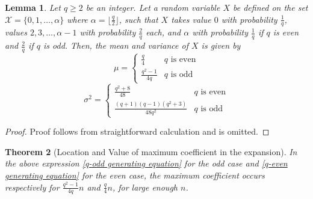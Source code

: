 \documentclass[a4paper,12pt]{article}
\newtheorem{theorem}{Theorem}
\newtheorem{lemma}[theorem]{Lemma}
\begin{document}
\begin{lemma}\label{mean and variance lemma}
    Let $q \geq 2$ be an integer. Let a random variable $X$ be defined on the set $\mathcal{X} = \{0, 1, \ldots, \alpha\}$ where $\alpha = \lfloor \frac{q}{2} \rfloor$, such that $X$ takes value $0$ with probability $\frac{1}{q}$, values $2,3, \ldots, \alpha-1$  with probability $\frac{2}{q}$ each, and $\alpha$ with probability $\frac{1}{q}$ if $q$ is even and $\frac{2}{q}$ if $q$ is odd. Then, the mean and variance of $X$ is given by
    \begin{equation}
        \mu = \begin{cases}
            \frac{q}{4} & \text{$q$ is even}\\
            \frac{q^2 -1}{4q} & \text{$q$ is odd}
        \end{cases}
    \end{equation}
    \begin{equation}
        \sigma^2 = \begin{cases}
            \frac{q^2 + 8}{48} & \text{$q$ is even}\\
            \frac{(q+1)(q-1)(q^2 + 3)}{48q^2} & \text{$q$ is odd}
        \end{cases}
    \end{equation}
\end{lemma}
\begin{proof}
    Proof follows from straightforward calculation and is omitted.
\end{proof}

\begin{theorem}[Location and Value of maximum coefficient in the expansion] \label{max coefficient}
    In the above expression \cref{q-odd generating equation} for the odd case and \cref{q-even generating equation} for the even case, the maximum coefficient occurs respectively for $\frac{q^2-1}{4q}n$ and $\frac{q}{4}n$, for large enough $n$.
\end{theorem}
\end{document}
